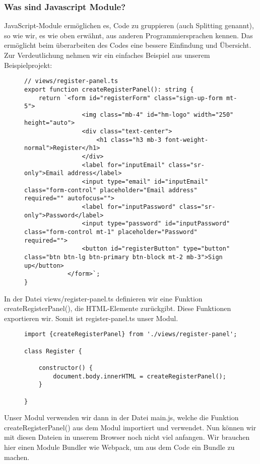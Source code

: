 \subsubsection{Was sind Javascript Module?}
JavaScript-Module ermöglichen es, Code zu gruppieren (auch \glqq{}Splitting\grqq{} genannt), so wie wir, es wie oben erwähnt, aus anderen Programmiersprachen kennen. Das ermöglicht beim überarbeiten des Codes eine bessere Einfindung und Übersicht. Zur Verdeutlichung nehmen wir ein einfaches Beispiel aus unserem Beispielprojekt:


\begin{figure}[H]
\begin{lstlisting}
// views/register-panel.ts
export function createRegisterPanel(): string {
    return `<form id="registerForm" class="sign-up-form mt-5">
                <img class="mb-4" id="hm-logo" width="250" height="auto">
                <div class="text-center">
                    <h1 class="h3 mb-3 font-weight-normal">Register</h1>
                </div>
                <label for="inputEmail" class="sr-only">Email address</label>
                <input type="email" id="inputEmail" class="form-control" placeholder="Email address" required="" autofocus="">
                <label for="inputPassword" class="sr-only">Password</label>
                <input type="password" id="inputPassword" class="form-control mt-1" placeholder="Password" required="">
                <button id="registerButton" type="button" class="btn btn-lg btn-primary btn-block mt-2 mb-3">Sign up</button>
            </form>`;
}
\end{lstlisting}
\end{figure}
In der Datei views/register-panel.ts definieren wir eine Funktion createRegisterPanel(), die HTML-Elemente zurückgibt. Diese Funktionen exportieren wir. Somit ist register-panel.ts unser Modul.

\begin{figure}[H]
\begin{lstlisting}
import {createRegisterPanel} from './views/register-panel';

class Register {

    constructor() {
        document.body.innerHTML = createRegisterPanel();
    }
    
}
\end{lstlisting}
\end{figure}

Unser Modul verwenden wir dann in der Datei main.js, welche die Funktion createRegisterPanel() aus dem Modul importiert und verwendet. Nun können wir mit diesen Dateien in unserem Browser noch nicht viel anfangen. Wir brauchen hier einen Module Bundler wie Webpack, um aus dem Code ein Bundle zu machen.

